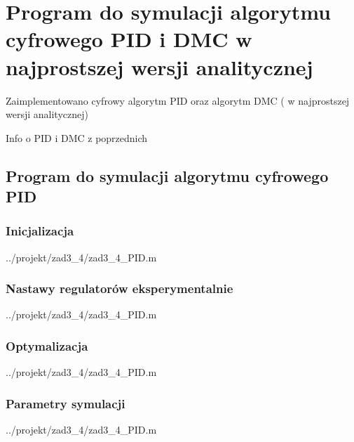 \section{Program do symulacji algorytmu cyfrowego PID i DMC w najprostszej wersji analitycznej}
\label{projekt:zad3}

Zaimplementowano	cyfrowy	algorytm	PID	oraz	algorytm	DMC	(	w	najprostszej	
wersji	analitycznej)

Info o PID i DMC z poprzednich

\subsection{Program do symulacji algorytmu cyfrowego PID}

\subsubsection{Inicjalizacja}

\ifdefined\CompileListings
    
        {../projekt/zad3_4/zad3_4_PID.m}
\fi

\subsubsection{Nastawy regulatorów eksperymentalnie}

\ifdefined\CompileListings
    
        {../projekt/zad3_4/zad3_4_PID.m}
    \newpage
\fi

\subsubsection{Optymalizacja}

\ifdefined\CompileListings
    
        {../projekt/zad3_4/zad3_4_PID.m}
\fi

\subsubsection{Parametry symulacji}

\ifdefined\CompileListings
    
        {../projekt/zad3_4/zad3_4_PID.m}
    \newpage
\fi


